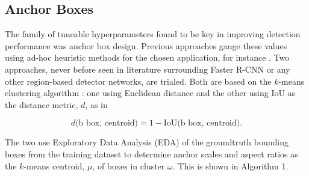 \documentclass[journal]{IEEEtran}
\begin{document}
\subsection{Anchor Boxes}

The family of tuneable hyperparameters found to be key in improving detection performance was anchor box design. Previous approaches gauge these values using ad-hoc heuristic methods for the chosen application, for instance \cite{textdetectionexample}. Two approaches, never before seen in literature surrounding Faster R-CNN or any other region-based detector networks, are trialed. Both are based on the $k$-means clustering algorithm \cite{kmeansoriginalpaper}: one using Euclidean distance and the other using IoU \cite{yolov2} as the distance metric, $d$, as in

\begin{equation}
d\text{(b box, centroid)} = 1 - \text{IoU(b box, centroid)}.
\label{eq:IoU_metric}
\end{equation}


The two use Exploratory Data Analysis (EDA) of the groundtruth bounding boxes from the training dataset to determine anchor scales and aspect ratios as the $k$-means centroid, $\mu$, of boxes in cluster $\omega$. This is shown in Algorithm 1.













\end{document}
